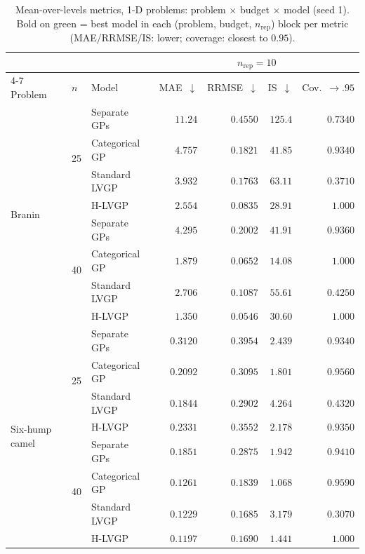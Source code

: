 \begin{table}[htbp]
\centering
\small
\setlength{\tabcolsep}{3.5pt}
\setlength{\fboxsep}{1.5pt}
\caption{Mean-over-levels metrics, 1-D problems: problem $\times$ budget $\times$ model (seed 1). Bold on green = best model in each (problem, budget, $n_{\mathrm{rep}}$) block per metric (MAE/RRMSE/IS: lower; coverage: closest to $0.95$).}
\label{tab:summary}
\begin{tabular}{lllrrrr}
\toprule
 & & & \multicolumn{4}{c}{$n_{\mathrm{rep}}=10$} \\
\cmidrule(lr){4-7}
Problem & $n$ & Model & MAE~$\downarrow$ & RRMSE~$\downarrow$ & IS~$\downarrow$ & Cov.~$\to.95$ \\
\midrule
\multirow{8}{*}{Branin} & \multirow{4}{*}{25} & Separate GPs & $11.24$ & $0.4550$ & $125.4$ & $0.7340$ \\
 &  & Categorical GP & $4.757$ & $0.1821$ & $41.85$ & \colorbox{green!20}{\boldmath$0.9340$} \\
 &  & Standard LVGP & $3.932$ & $0.1763$ & $63.11$ & $0.3710$ \\
 &  & H-LVGP & \colorbox{green!20}{\boldmath$2.554$} & \colorbox{green!20}{\boldmath$0.0835$} & \colorbox{green!20}{\boldmath$28.91$} & $1.000$ \\
\cmidrule(lr){2-7}
 & \multirow{4}{*}{40} & Separate GPs & $4.295$ & $0.2002$ & $41.91$ & \colorbox{green!20}{\boldmath$0.9360$} \\
 &  & Categorical GP & $1.879$ & $0.0652$ & \colorbox{green!20}{\boldmath$14.08$} & $1.000$ \\
 &  & Standard LVGP & $2.706$ & $0.1087$ & $55.61$ & $0.4250$ \\
 &  & H-LVGP & \colorbox{green!20}{\boldmath$1.350$} & \colorbox{green!20}{\boldmath$0.0546$} & $30.60$ & $1.000$ \\
\midrule
\multirow{8}{*}{Six-hump camel} & \multirow{4}{*}{25} & Separate GPs & $0.3120$ & $0.3954$ & $2.439$ & $0.9340$ \\
 &  & Categorical GP & $0.2092$ & $0.3095$ & \colorbox{green!20}{\boldmath$1.801$} & \colorbox{green!20}{\boldmath$0.9560$} \\
 &  & Standard LVGP & \colorbox{green!20}{\boldmath$0.1844$} & \colorbox{green!20}{\boldmath$0.2902$} & $4.264$ & $0.4320$ \\
 &  & H-LVGP & $0.2331$ & $0.3552$ & $2.178$ & $0.9350$ \\
\cmidrule(lr){2-7}
 & \multirow{4}{*}{40} & Separate GPs & $0.1851$ & $0.2875$ & $1.942$ & \colorbox{green!20}{\boldmath$0.9410$} \\
 &  & Categorical GP & $0.1261$ & $0.1839$ & \colorbox{green!20}{\boldmath$1.068$} & $0.9590$ \\
 &  & Standard LVGP & $0.1229$ & \colorbox{green!20}{\boldmath$0.1685$} & $3.179$ & $0.3070$ \\
 &  & H-LVGP & \colorbox{green!20}{\boldmath$0.1197$} & $0.1690$ & $1.441$ & $1.000$ \\
\bottomrule
\end{tabular}
\end{table}
